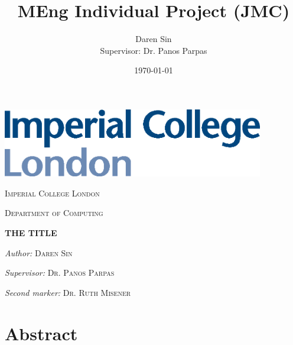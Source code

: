 \documentclass[12pt, twoside, a4paper]{report}
\title{MEng Individual Project (JMC)}
\author{Daren Sin \\  Supervisor: Dr. Panos Parpas}
\date{\today}
\newcommand\blankpage{%
    \null
    \thispagestyle{empty}%
    \addtocounter{page}{-1}%
    \newpage}
\begin{document}
\begin{titlingpage}

\vspace*{2cm}

\begin{center}
\includegraphics[height=3cm]{images/imperial}
\end{center}

\vspace{2cm}
\begin{center}
\Large \textsc{Imperial College London}

\textsc{Department of Computing}
\end{center}

\vspace{2cm}

\begin{center}
\Large \textsc{\thetitle}

\textbf{THE TITLE}
\end{center}

\vspace{2cm}

\begin{center}
\large \textit{Author:} \textsc{Daren Sin}

\textit{Supervisor:} \textsc{Dr. Panos Parpas}

\textit{Second marker:} \textsc{Dr. Ruth Misener}
\end{center}

\vspace{2cm}

\begin{center}
\normalsize \textsc{\thedate}
\end{center}

\end{titlingpage}


\afterpage{\blankpage}

\chapter*{Abstract}

\afterpage{\blankpage}
\end{document}
